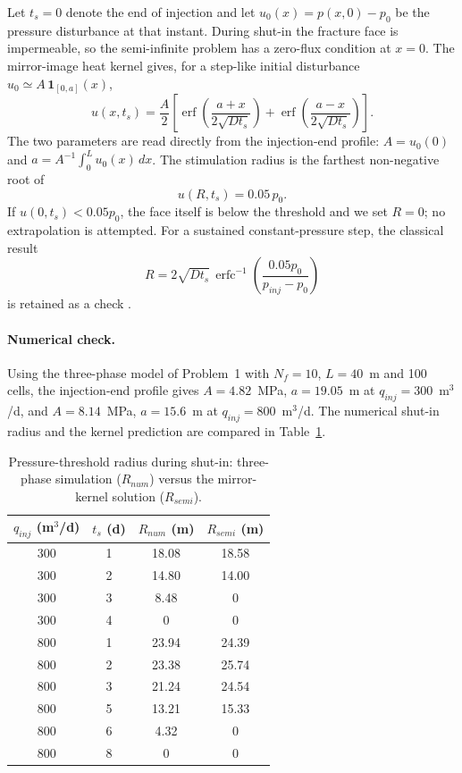 Let $t_s=0$ denote the end of injection and let
$u_0(x)=p(x,0)-p_0$ be the pressure disturbance at that instant. During
shut-in the fracture face is impermeable, so the semi-infinite problem has a
zero-flux condition at $x=0$. The mirror-image heat kernel gives, for a
step-like initial disturbance $u_0\simeq A\,\mathbf 1_{[0,a]}(x)$,
\begin{equation}
u(x,t_s)=\frac{A}{2}\left[
\operatorname{erf}\!\left(\frac{a+x}{2\sqrt{Dt_s}}\right)
+\operatorname{erf}\!\left(\frac{a-x}{2\sqrt{Dt_s}}\right)\right].
\label{eq:kernel}
\end{equation}
The two parameters are read directly from the injection-end profile:
$A=u_0(0)$ and $a=A^{-1}\int_0^L u_0(x)\,dx$. The stimulation radius is the
farthest non-negative root of
\begin{equation}
u(R,t_s)=0.05\,p_0 .
\label{eq:threshold}
\end{equation}
If $u(0,t_s)<0.05p_0$, the face itself is below the threshold and we set
$R=0$; no extrapolation is attempted. For a sustained constant-pressure step,
the classical result
\begin{equation}
R=2\sqrt{Dt_s}\,\operatorname{erfc}^{-1}\!\left(
\frac{0.05p_0}{p_{inj}-p_0}\right)
\label{eq:erfc}
\end{equation}
is retained as a check \cite{p2-01}.

\paragraph{Numerical check.}
Using the three-phase model of Problem~1 with $N_f=10$, $L=40$~m and 100
cells, the injection-end profile gives $A=4.82$~MPa,
$a=19.05$~m at $q_{inj}=300$~m$^3$/d, and $A=8.14$~MPa, $a=15.6$~m at
$q_{inj}=800$~m$^3$/d. The numerical shut-in radius and the kernel prediction
are compared in Table~\ref{tbl:p2_check}.

\begin{table}[h!t]
\centering
\caption{Pressure-threshold radius during shut-in: three-phase simulation
($R_{num}$) versus the mirror-kernel solution ($R_{semi}$).}
\label{tbl:p2_check}
\small
\begin{tabular}{cccc}
\toprule[1.5pt]
$q_{inj}$ (m$^3$/d) & $t_s$ (d) & $R_{num}$ (m) & $R_{semi}$ (m)\\
\midrule[1pt]
300 & 1 & 18.08 & 18.58\\
300 & 2 & 14.80 & 14.00\\
300 & 3 & 8.48 & 0\\
300 & 4 & 0 & 0\\
800 & 1 & 23.94 & 24.39\\
800 & 2 & 23.38 & 25.74\\
800 & 3 & 21.24 & 24.54\\
800 & 5 & 13.21 & 15.33\\
800 & 6 & 4.32 & 0\\
800 & 8 & 0 & 0\\
\bottomrule[1.5pt]
\end{tabular}
\end{table}

